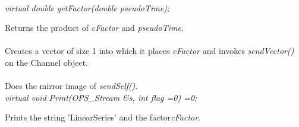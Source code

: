  \\
{\em  virtual double getFactor(double pseudoTime);}

Returns the product of {\em cFactor} and {\em pseudoTime}. \\

\\
Creates a vector of size 1 into which it places {\em cFactor} and
invokes {\em sendVector()} on the Channel object. \\

\\
Does the mirror image of {\em sendSelf()}. \\

{\em  virtual void Print(OPS_Stream \&s, int flag =0) =0;}

Prints the string 'LinearSeries' and the factor{\em cFactor}.
